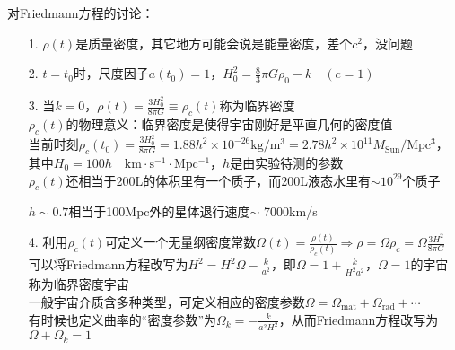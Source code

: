 \par 
对Friedmann方程的讨论：
\begin{itemize}
	\item[1. ] $\rho(t)$是质量密度，其它地方可能会说是能量密度，差个$c^2$，没问题
	\item[2. ] $t = t_0$时，尺度因子$a(t_0) = 1$，$H_0^2 = \frac{8}{3} \pi G \rho_0 - k \quad(c = 1)$
	\item[3. ] 当$k = 0$，$\rho(t) = \frac{3 H_0^2}{8 \pi G} \equiv \rho_c(t)$称为临界密度 \\
	$\rho_c(t)$的物理意义：临界密度是使得宇宙刚好是平直几何的密度值 \\
	当前时刻$\rho_c(t_0) = \frac{3 H_0^2}{8 \pi G} = 1.88 h^2 \times 10^{-26} \mathrm{kg/m^3} = 2.78 h^2 \times 10^{11} M_{\text{Sun}} \mathrm{/Mpc^3}$，其中$H_0 = 100 h \quad \mathrm{km \cdot s^{-1} \cdot Mpc^{-1}}$，$h$是由实验待测的参数 \\
	$\rho_c(t)$还相当于200L的体积里有一个质子，而200L液态水里有$\sim 10^{29}$个质子 \\
	\begin{table}[!h]
		\tiny
		\centering
		\caption{$h$的测量}
		\label{table:2}
	\end{table}
	$h \sim 0.7$相当于100Mpc外的星体退行速度$\sim$ 7000km/s
	
	\item[4. ] 利用$\rho_c(t)$可定义一个无量纲密度常数$\Omega(t) = \frac{\rho(t)}{\rho_c(t)} \Rightarrow \rho = \Omega \rho_c = \Omega \frac{3 H^2}{8 \pi G}$ \\
	可以将Friedmann方程改写为$H^2 = H^2 \Omega - \frac{k}{a^2}$，即$\Omega = 1 + \frac{k}{H^2 a^2}$，$\Omega = 1$的宇宙称为临界密度宇宙 \\
	一般宇宙介质含多种类型，可定义相应的密度参数$\Omega = \Omega_{\text{mat}} + \Omega_{\text{rad}} + \cdots$ \\
	有时候也定义曲率的“密度参数”为$\Omega_k = - \frac{k}{a^2 H^2}$，从而Friedmann方程改写为$\Omega + \Omega_k = 1$
\end{itemize}



